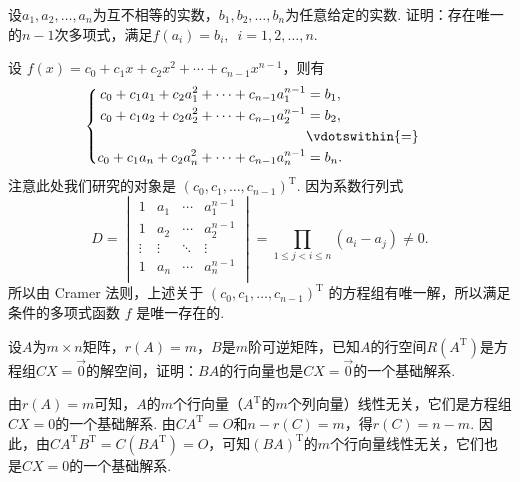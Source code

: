 \begin{exercise}
\begin{exgroup}
        \item 设$a_1,a_2,\ldots,a_n$为互不相等的实数，$b_1,b_2,\ldots,b_n$为任意给定的实数. 证明：存在唯一的$n-1$次多项式，满足$f(a_i)=b_i,\enspace i=1,2,\ldots,n$.
        \begin{answer}
            设 $f(x) = c_0+c_1x+c_2x^2+\cdots+c_{n-1}x^{n-1}$，则有
            \[\begin{cases} \begin{aligned}
                        c_0+c_1a_1+c_2a_1^2+\cdots+c_{n-1}a_1^{n-1} & = b_1,            \\
                        c_0+c_1a_2+c_2a_2^2+\cdots+c_{n-1}a_2^{n-1} & = b_2,            \\
                                                                    & \vdotswithin{ = } \\
                        c_0+c_1a_n+c_2a_n^2+\cdots+c_{n-1}a_n^{n-1} & = b_n.            \\
                    \end{aligned} \end{cases}\]
            注意此处我们研究的对象是 $(c_0, c_1, \ldots, c_{n-1})^{\mathrm{T}}$. 因为系数行列式
            \[D = \begin{vmatrix}
                    1      & a_1    & \cdots & a_1^{n-1} \\
                    1      & a_2    & \cdots & a_2^{n-1} \\
                    \vdots & \vdots & \ddots & \vdots    \\
                    1      & a_n    & \cdots & a_n^{n-1} \\
                \end{vmatrix} = \prod_{1 \leqslant j < i \leqslant n} (a_i-a_j) \neq 0.\]
            所以由 Cramer 法则，上述关于 $(c_0, c_1, \ldots, c_{n-1})^{\mathrm{T}}$ 的方程组有唯一解，所以满足条件的多项式函数 $f$ 是唯一存在的.
        \end{answer}

        \item 设$A$为$m \times n$矩阵，$r(A)=m$，$B$是$m$阶可逆矩阵，已知$A$的行空间$R(A^\mathrm{T})$是方程组$CX=\vec{0}$的解空间，证明：$BA$的行向量也是$CX=\vec{0}$的一个基础解系.
        \begin{answer}
            由$r(A)=m$可知，$A$的$m$个行向量（$A^\mathrm{T}$的$m$个列向量）线性无关，它们是方程组$CX=0$的一个基础解系. 由$CA^\mathrm{T}=O$和$n-r(C)=m$，得$r(C)=n-m$. 因此，由$CA^\mathrm{T}B^\mathrm{T}=C(BA^\mathrm{T})=O$，可知$(BA)^\mathrm{T}$的$m$个行向量线性无关，它们也是$CX=0$的一个基础解系.
        \end{answer}


\end{exgroup}
\end{exercise}
